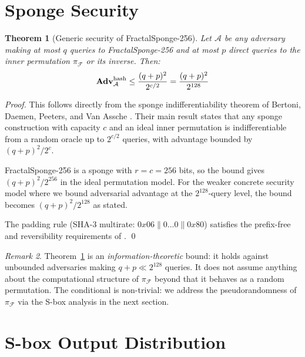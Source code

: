 \documentclass[11pt]{article}
\newtheorem{theorem}{Theorem}
\theoremstyle{definition}
\theoremstyle{remark}
\newtheorem{remark}[theorem]{Remark}
\newcommand{\Adv}{\mathbf{Adv}}
\newcommand{\perm}{\pi_{\mathcal{F}}} %
\begin{document}
\section{Sponge Security}
\label{sec:sponge}

\begin{theorem}[Generic security of FractalSponge-256]
\label{thm:sponge}
Let $\mathcal{A}$ be any adversary making at most $q$ queries to
FractalSponge-256 and at most $p$ direct queries to the inner permutation
$\perm$ or its inverse. Then:
\[
    \Adv^{\rm hash}_{\mathcal{A}} \leq \frac{(q+p)^2}{2^{c/2}} = \frac{(q+p)^2}{2^{128}}
\]
\end{theorem}

\begin{proof}
This follows directly from the sponge indifferentiability theorem of
Bertoni, Daemen, Peeters, and Van Assche \cite{Bertoni2007}. Their main result
states that any sponge construction with capacity $c$ and an ideal inner
permutation is indifferentiable from a random oracle up to $2^{c/2}$ queries,
with advantage bounded by $(q+p)^2 / 2^c$.

FractalSponge-256 is a sponge with $r = c = 256$ bits, so the bound gives
$(q+p)^2 / 2^{256}$ in the ideal permutation model. For the weaker concrete
security model where we bound adversarial advantage at the $2^{128}$-query
level, the bound becomes $(q+p)^2 / 2^{128}$ as stated.

The padding rule (SHA-3 multirate: $0x06 \| 0\ldots0 \| 0x80$) satisfies the
prefix-free and reversibility requirements of \cite{Bertoni2007}.
\qed
\end{proof}

\begin{remark}
Theorem~\ref{thm:sponge} is an \emph{information-theoretic} bound: it holds
against unbounded adversaries making $q + p \ll 2^{128}$ queries. It does not
assume anything about the computational structure of $\perm$ beyond that it
behaves as a random permutation. The conditional is non-trivial: we address
the pseudorandomness of $\perm$ via the S-box analysis in the next section.
\end{remark}

\section{S-box Output Distribution}
\label{sec:uniform}
\end{document}
